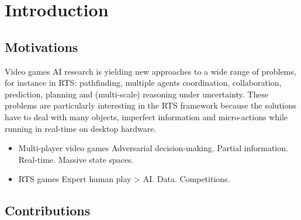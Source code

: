 \chapter{Introduction}


\section{Motivations}

Video games AI research is yielding new approaches to a wide range of problems, for instance in RTS: pathfinding, multiple agents coordination, collaboration, prediction, planning and (multi-scale) reasoning under uncertainty. These problems are particularly interesting in the RTS framework because the solutions have to deal with many objects, imperfect information and micro-actions while running in real-time on desktop hardware.

\begin{itemize}
\item Multi-player video games
Adversarial decision-making. Partial information. Real-time. Massive state spaces.
\item RTS games
Expert human play > AI. Data. Competitions.
\end{itemize}

\section{Contributions}

